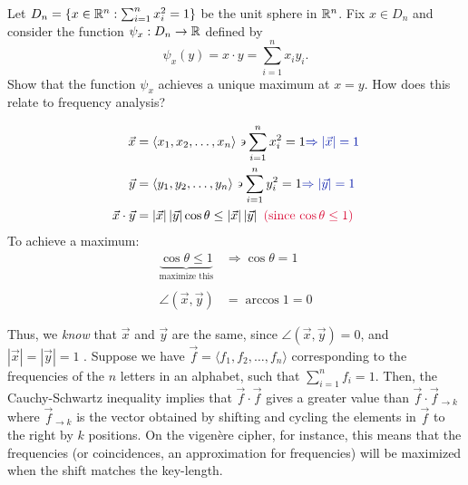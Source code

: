 \begin{problem}
Let $D_n = \{x \in \mathbb{R}^n : \sum_{i=1}^n x_i^2 = 1\}$ be the unit sphere
in $\mathbb{R}^n$.  Fix $x \in D_n$ and consider the function $\psi_x : D_n
\to \mathbb{R}$ defined by
\[
\psi_x(y) = x \cdot y = \sum_{i=1}^n x_i y_i.
\]
Show that the function $\psi_x$ achieves a unique maximum at $x=y$.
How does this relate to frequency analysis?
\end{problem}

\begin{Answer}
\begin{align*}
  \vec{x} &= \langle x_1, x_2, \dots, x_n\rangle \backepsilon \sum_{i=1}^n x_i^2 = 1 \zaff{\Rightarrow \left | \vec{x} \right | = 1}\\
  \vec{y} &= \langle y_1, y_2, \dots, y_n\rangle \backepsilon \sum_{i=1}^n y_i^2 = 1 \zaff{\Rightarrow \left | \vec{y} \right | = 1}\\
  \vec{x} \cdot \vec{y} &=\left | \vec{x} \right |\left | \vec{y} \right |\cos\theta
  \le \left | \vec{x} \right |\left | \vec{y} \right | \crim{\text{    (since $\cos \theta \le 1$)}}
\end{align*}
\noindent
To achieve a maximum:
\begin{align*}
  \underbrace{\cos \theta \le 1}_{\text{maximize this}} &\Rightarrow \cos \theta = 1\\
  \\
  \angle(\vec{x}, \vec{y}) &= \arccos 1 = 0
\end{align*}

\noindent
Thus, we \emph{know} that $\vec{x}$ and $\vec{y}$ are the same,
since $ \angle(\vec{x}, \vec{y}) = 0$,
and $\left | \vec{x} \right | = \left | \vec{y} \right| = 1$
.
\newline
\newline
\noindent
\color{zaffre}
Suppose we have $\vec{f} = \langle f_1, f_2, \dots, f_n\rangle$
corresponding to the frequencies of the
$n$ letters in an alphabet, such that $\sum_{i=1}^n f_i = 1$.
Then, the Cauchy-Schwartz inequality implies that $\vec{f} \cdot \vec{f}$
gives a greater value than $\vec{f} \cdot \vec{f}_{\to k}$ where $\vec{f}_{\to k}$ is the vector
obtained by shifting and cycling the elements in $\vec{f}$ to the right by $k$ positions.
\newline
On the vigen\`ere cipher, for instance, this means that the frequencies (or coincidences, an approximation for frequencies)
will be maximized when the shift matches the key-length.
\end{Answer}
